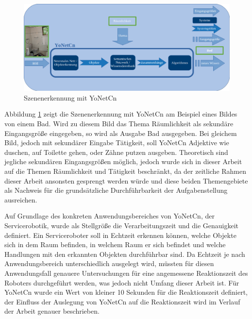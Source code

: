 \begin{figure}[h]
	
	\begin{center}
		
		\includegraphics[width=14cm]{images/Masteridee_2.png}
		
		\caption{Szenenerkennung mit YoNetCn}
		
		\label{system_Bild2}
		
	\end{center}
	
	
\end{figure}


Abbildung \ref{system_Bild2} zeigt die Szenenerkennung mit YoNetCn am Beispiel eines Bildes von einem Bad. Wird zu diesem Bild das Thema Räumlichkeit als sekundäre Eingangsgröße eingegeben, so wird als Ausgabe Bad ausgegeben. Bei gleichem Bild, jedoch mit sekundärer Eingabe Tätigkeit, soll YoNetCn Adjektive wie duschen, auf Toilette gehen, oder Zähne putzen ausgeben. Theoretisch sind jegliche sekundären Eingangsgrößen möglich, jedoch wurde sich in dieser Arbeit auf die Themen Räumlichkeit und Tätigkeit beschränkt, da der zeitliche Rahmen dieser Arbeit ansonsten gesprengt werden würde und diese beiden Themengebiete als Nachweis für die grundsätzliche Durchführbarkeit der Aufgabenstellung ausreichen. 


Auf Grundlage des konkreten Anwendungsbereiches von YoNetCn, der Servicerobotik, wurde als Stellgröße die Verarbeitungszeit und die Genauigkeit definiert. Ein Serviceroboter soll in Echtzeit erkennen können, welche Objekte sich in dem  Raum befinden, in welchem Raum er sich befindet und welche Handlungen mit den erkannten Objekten durchführbar sind. Da Echtzeit je nach Anwendungsbereich unterschiedlich ausgelegt wird, müssten für diesen Anwendungsfall genauere Untersuchungen für eine angemessene Reaktionszeit des Roboters durchgeführt werden, was jedoch nicht Umfang dieser Arbeit ist. Für YoNetCn wurde ein Wert von kleiner 10 Sekunden für die Reaktionszeit definiert, der Einfluss der Auslegung von YoNetCn auf die Reaktionszeit wird im Verlauf der Arbeit genauer beschrieben. 

